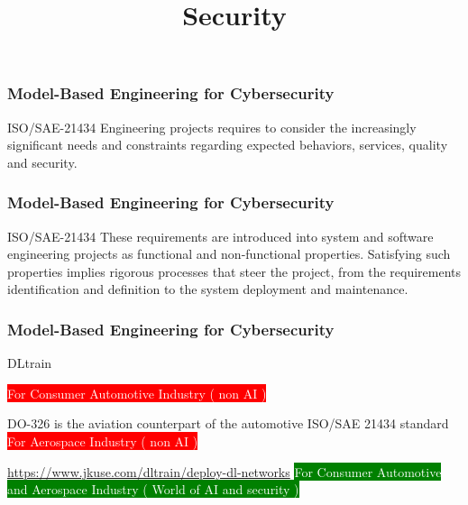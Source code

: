 
\title[Systems Engineering]{Security} 




\newpage 
\begin{frame}
\frametitle{Model-Based Engineering for Cybersecurity}

\begin{block}{ISO/SAE-21434  }
Engineering projects requires to consider the increasingly significant needs and constraints regarding expected behaviors, services, quality and security. 
\end{block}
\end{frame}


\newpage 
\begin{frame}
\frametitle{Model-Based Engineering for Cybersecurity}

\begin{block}{ISO/SAE-21434  }
These requirements are introduced into system and software engineering projects as functional and non-functional properties. Satisfying such properties implies rigorous processes that steer the project, from the requirements identification and definition to the system deployment and maintenance. 
\end{block}
\end{frame}



\newpage 

\begin{frame}
\frametitle{Model-Based Engineering for Cybersecurity}

\begin{block}{DLtrain }

\colorbox{red}{ \textcolor{white}{ For Consumer Automotive Industry ( non AI ) } }

DO-326 is the aviation counterpart of the automotive ISO/SAE 21434 standard
\colorbox{red}{ \textcolor{white}{ For  Aerospace  Industry ( non AI ) } }

\url{https://www.jkuse.com/dltrain/deploy-dl-networks}
\colorbox{green}{ \textcolor{white}{ For Consumer Automotive  and Aerospace Industry ( World of AI and security ) } }

\end{block}
\end{frame}



\newpage 

